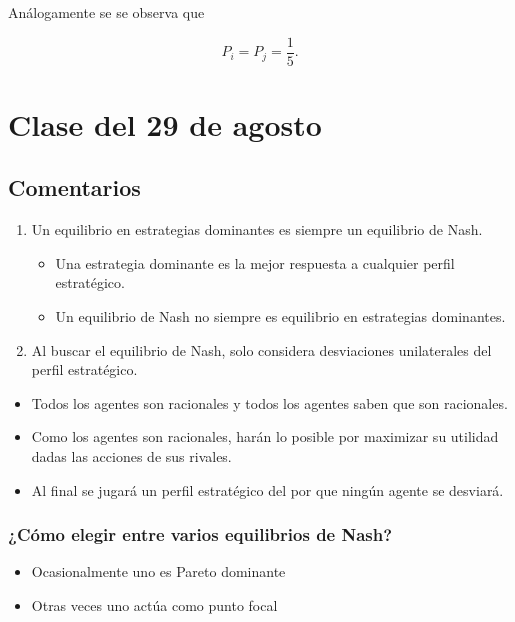 \documentclass[letterpaper,12pt,twocolumn]{report}
\begin{document}
Análogamente se se observa que 

$$ P_i = P_j = \dfrac{1}{5}. $$

\section{Clase del 29 de agosto}

\subsection*{Comentarios}

\begin{enumerate}
	\item Un equilibrio en estrategias dominantes es siempre un equilibrio de Nash.
	\begin{itemize}
		\item Una estrategia dominante es la mejor respuesta a cualquier perfil estratégico.
		\item Un equilibrio de Nash no siempre es equilibrio en estrategias dominantes.
	\end{itemize}
	\item Al buscar el equilibrio de Nash, solo considera desviaciones unilaterales del perfil estratégico.
\end{enumerate}


\begin{tcolorbox}[title=Fundamentos del equilibrio de Nash]
	\begin{itemize}
		\item Todos los agentes son racionales y todos los agentes saben que son racionales.
		\item Como los agentes son racionales, harán lo posible por maximizar su utilidad dadas las acciones de sus rivales.
		\item Al final se jugará un perfil estratégico del por que ningún agente se desviará.
	\end{itemize}
\end{tcolorbox}

\subsubsection*{¿Cómo elegir entre varios equilibrios de Nash?}

\begin{itemize}
	\item Ocasionalmente uno es Pareto dominante
	\item Otras veces uno actúa como punto focal
\end{itemize}
\end{document}
